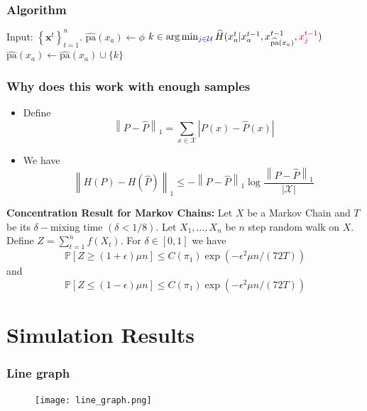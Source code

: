 \documentclass{beamer}
\begin{document}
\begin{frame}
\frametitle{Algorithm}
\footnotesize
\hline
\begin{algorithmic}[1]
\STATE Input: $\left\{\mathbf{x}^t\right\}_{t=1}^{n}$.
\STATE $\widehat{\text{pa}}(x_a) \leftarrow \phi$%
\STATE $k \in \arg \min_{{\color{blue}{j \in \mathcal{U}}}}\widehat{H}(x^t_a|x^{t-1}_a, x^{t-1}_{\widehat{\text{pa}}(x_a)}, {\color{red}{x^{t-1}_j}})$
\STATE $\widehat{\text{pa}}(x_a) \leftarrow \widehat{\text{pa}}(x_a) \cup \{k\}$
\ENDIF
\ENDWHILE
\ENDFOR
\end{algorithmic}
\vspace{0.1in}
\hline
\end{frame}


\begin{frame}
\frametitle{Why does this work with enough samples}
\footnotesize
\begin{itemize}
\item Define 
$$\left\|P - \widehat{P}\right\|_1 = \sum_{x \in \mathcal{X}}\left|P(x) - \widehat{P}(x)\right|$$
\item We have
$$\left\|H(P) - H(\widehat{P})\right\|_1 \leq -\left\|P - \widehat{P}\right\|_1\log \frac{\left\|P - \widehat{P}\right\|_1}{\left| \mathcal{X}\right|}$$
\end{itemize}
\begin{theorem}\textbf{Concentration Result for Markov Chains:}
Let $X$ be a Markov Chain and $T$ be its $\delta-$mixing time $(\delta < 1/8)$. Let $X_1,\ldots, X_n$ be $n$ step random walk on $X$. Define $Z = \sum_{t=1}^{n}f(X_t)$. For $\delta \in [0,1]$ we have
$$\mathbb{P}[Z \geq (1+\epsilon)\mu n] \leq C(\pi_{1})\exp \left(-\epsilon^{2}\mu n/(72T)\right)$$
and
$$\mathbb{P}[Z \leq (1-\epsilon)\mu n] \leq C(\pi_{1})\exp \left(-\epsilon^{2}\mu n/(72T)\right)$$
\end{theorem}
\end{frame}

\section{Simulation Results}
\begin{frame}
\frametitle{Line graph}
\begin{figure}
	\centering
		\texttt{[image: line\_graph.png]}
\end{figure}
\end{frame}
\end{document}
